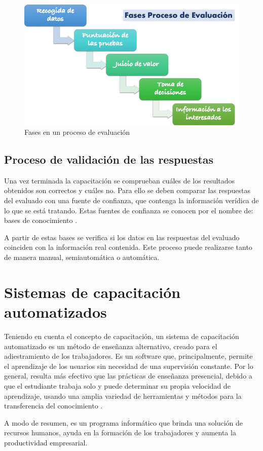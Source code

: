 \begin{figure}[h]
\centering
 \includegraphics[width=0.5\linewidth]{imagen/fases-proceso-evaluacion.jpg}
 \caption{Fases en un proceso de evaluación}
 \label{fig:fases-evaluacion} 
\end{figure}

\subsection{Proceso de validación de las respuestas}
Una vez terminada la capacitación se comprueban cuáles de los resultados obtenidos son correctos y cuáles no. Para ello se deben comparar las respuestas del evaluado con una fuente de confianza, que contenga la información verídica de lo que se está tratando. Estas fuentes de confianza se conocen por el nombre de: bases de conocimiento \cite{Rasheed2021}.

A partir de estas bases se verifica si los datos en las respuestas del evaluado coinciden con la información real contenida. Este proceso puede realizarse tanto de manera manual, semiautomática o automática.


\section{Sistemas de capacitación automatizados}
Teniendo en cuenta el concepto de capacitación, un sistema de capacitación automatizado es un método de enseñanza alternativo, creado para el adiestramiento de los trabajadores. Es un software que, principalmente, permite el aprendizaje de los usuarios sin necesidad de una supervisión constante. Por lo general, resulta más efectivo que las prácticas de enseñanza presencial, debido a que el estudiante trabaja solo y puede determinar su propia velocidad de aprendizaje, usando una amplia variedad de herramientas y métodos para la transferencia del conocimiento \cite{ISEM2022}.

A modo de resumen, es un programa informático que brinda una solución de recursos humanos, ayuda en la formación de los trabajadores y aumenta la productividad empresarial.

